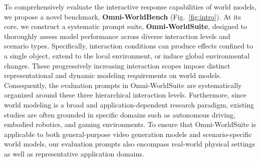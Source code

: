 To comprehensively evaluate the interactive response capabilities of world models, we propose a novel benchmark, \textbf{Omni-WorldBench} (Fig.~\ref{fig:intro}).
At its core, we construct a systematic prompt suite, \textbf{Omni-WorldSuite}, designed to thoroughly assess model performance across diverse interaction levels and scenario types.
Specifically, interaction conditions can produce effects confined to a single object, extend to the local environment, or induce global environmental changes. These progressively increasing interaction scopes impose distinct representational and dynamic modeling requirements on world models. Consequently, the evaluation prompts in Omni-WorldSuite are systematically organized around these three hierarchical interaction levels.
Furthermore, since world modeling is a broad and application-dependent research paradigm, existing studies are often grounded in specific domains such as autonomous driving, embodied robotics, and gaming environments. 
To ensure that Omni-WorldSuite is applicable to both general-purpose video generation models and scenario-specific world models, our evaluation prompts also encompass real-world physical settings as well as representative application domains.


